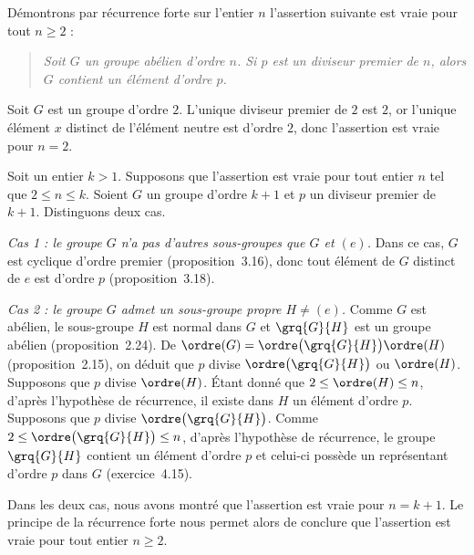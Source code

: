 
Démontrons par récurrence forte sur l'entier $n$ l'assertion suivante est vraie pour tout $n \geq 2$ :
\begin{quote}\itshape
  Soit $G$ un groupe abélien d'ordre $n$.
  Si $p$ est un diviseur premier de $n$, alors $G$ contient un élément d'ordre $p$.
\end{quote}

Soit $G$ est un groupe d'ordre $2$.
L'unique diviseur premier de $2$ est $2$, or l'unique élément $x$ distinct de l'élément neutre est d'ordre $2$, donc l'assertion est vraie pour $n = 2$.

Soit un entier $k > 1$.
Supposons que l'assertion est vraie pour tout entier $n$ tel que $2\leq n\leq k$.
Soient $G$ un groupe d'ordre $k + 1$ et $p$ un diviseur premier de $k + 1$.
Distinguons deux cas.

\textit{Cas 1 : le groupe $G$ n'a pas d'autres sous-groupes que $G$ et $(e)$.}
Dans ce cas, $G$ est cyclique d'ordre premier (proposition~3.16), donc tout élément de $G$ distinct de $e$ est d'ordre $p$ (proposition~3.18).

\textit{Cas 2 : le groupe $G$ admet un sous-groupe propre $H\neq (e)$.}
Comme $G$ est abélien, le sous-groupe $H$ est normal dans $G$ et $\grq{G}{H}$ est un groupe abélien (proposition~2.24).
De $\ordre(G) = \ordre\bigl(\grq{G}{H}\bigr)\ordre(H)$ (proposition~2.15), on déduit que $p$ divise $\ordre\bigl(\grq{G}{H}\bigr)$ ou $\ordre(H)$.
Supposons que $p$ divise $\ordre(H)$.
Étant donné que $2\leq\ordre(H)\leq n$, d'après l'hypothèse de récurrence, il existe dans $H$ un élément d'ordre $p$.
Supposons que $p$ divise $\ordre\bigl(\grq{G}{H}\bigr)$.
Comme $2\leq\ordre\bigl(\grq{G}{H}\bigr)\leq n$, d'après l'hypothèse de récurrence, le groupe $\grq{G}{H}$ contient un élément d'ordre $p$ et celui-ci possède un représentant d'ordre $p$ dans $G$ (exercice~4.15).

Dans les deux cas, nous avons montré que l'assertion est vraie pour $n = k + 1$.
Le principe de la récurrence forte nous permet alors de conclure que l'assertion est vraie pour tout entier $n\geq 2$.
